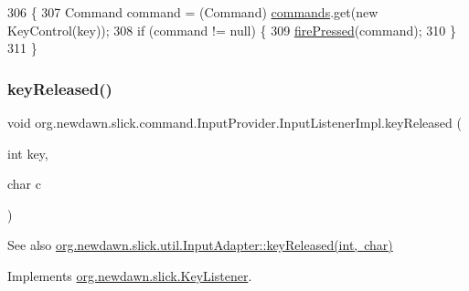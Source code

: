 \begin{DoxyCode}
306                                                 \{
307             Command command = (Command) \mbox{\hyperlink{classorg_1_1newdawn_1_1slick_1_1command_1_1_input_provider_ab2bd0c08506a59bc7457d7a87cf873d2}{commands}}.get(\textcolor{keyword}{new} KeyControl(key));
308             \textcolor{keywordflow}{if} (command != null) \{
309                 \mbox{\hyperlink{classorg_1_1newdawn_1_1slick_1_1command_1_1_input_provider_a82cd36086b5780ccce446717e8075e96}{firePressed}}(command);
310             \}
311         \}
\end{DoxyCode}
\mbox{\label{classorg_1_1newdawn_1_1slick_1_1command_1_1_input_provider_1_1_input_listener_impl_a2da6f6871609630698f578561063dcf9}} 
\subsubsection{\texorpdfstring{key\+Released()}{keyReleased()}}
{\footnotesize\ttfamily void org.\+newdawn.\+slick.\+command.\+Input\+Provider.\+Input\+Listener\+Impl.\+key\+Released (\begin{DoxyParamCaption}\item[{int}]{key,  }\item[{char}]{c }\end{DoxyParamCaption})\hspace{0.3cm}{\ttfamily [inline]}}

\begin{DoxySeeAlso}{See also}
\mbox{\hyperlink{classorg_1_1newdawn_1_1slick_1_1util_1_1_input_adapter_a2b610479cd3d4c0eb61cb4ed83c95764}{org.\+newdawn.\+slick.\+util.\+Input\+Adapter\+::key\+Released(int, char)}} 
\end{DoxySeeAlso}


Implements \mbox{\hyperlink{interfaceorg_1_1newdawn_1_1slick_1_1_key_listener_a474673b59bc77266bcef3c261c26ee2b}{org.\+newdawn.\+slick.\+Key\+Listener}}.


